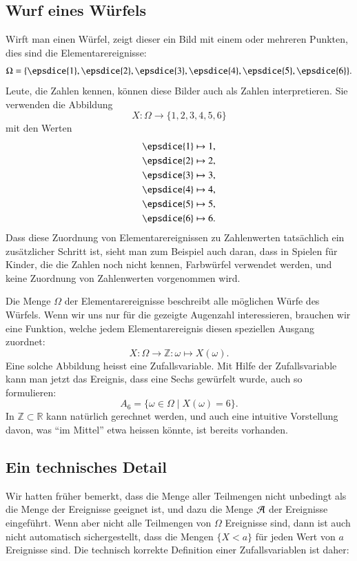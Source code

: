 \subsection{Wurf eines Würfels}
Wirft man einen Würfel, zeigt dieser ein Bild mit einem oder mehreren Punkten, 
dies sind die Elementarereignisse:
\[
\Omega = \{
\epsdice{1},
\epsdice{2},
\epsdice{3},
\epsdice{4},
\epsdice{5},
\epsdice{6}
\}.
\]
Leute, die Zahlen kennen, können diese Bilder auch als Zahlen interpretieren.
Sie verwenden die Abbildung
\[
X\colon \Omega \to \{1,2,3,4,5,6\}
\]
mit den Werten
\begin{align*}
\epsdice{1}&\mapsto 1,\\
\epsdice{2}&\mapsto 2,\\
\epsdice{3}&\mapsto 3,\\
\epsdice{4}&\mapsto 4,\\
\epsdice{5}&\mapsto 5,\\
\epsdice{6}&\mapsto 6.
\end{align*}
Dass diese Zuordnung von Elementarereignissen zu Zahlenwerten tatsächlich
ein zusätzlicher Schritt ist, sieht man zum Beispiel auch daran, dass
in Spielen für Kinder, die die Zahlen noch nicht kennen, Farbwürfel
verwendet werden, und keine Zuordnung von Zahlenwerten vorgenommen wird.

Die Menge $\Omega$ der Elementarereignisse beschreibt alle möglichen Würfe
des Würfels.
Wenn wir uns nur für die gezeigte Augenzahl interessieren,
brauchen wir eine Funktion, welche jedem Elementarereignis diesen speziellen
Ausgang zuordnet:
\[
X: \Omega\to{\mathbb Z}: \omega\mapsto X(\omega).
\]
Eine solche Abbildung heisst eine Zufallsvariable.
Mit Hilfe der Zufallsvariable kann man jetzt das Ereignis, dass eine Sechs
gewürfelt wurde, auch so formulieren:
\[
A_6=\{\omega\in\Omega\;|\;X(\omega) = 6\}.
\]
In $\mathbb{Z}\subset\mathbb{R}$ kann natürlich gerechnet werden, und
auch eine intuitive Vorstellung davon, was ``im Mittel'' etwa heissen
könnte, ist bereits vorhanden.

\subsection{Ein technisches Detail}
Wir hatten früher bemerkt, dass die Menge aller Teilmengen nicht unbedingt
als die Menge der Ereignisse geeignet ist, und dazu die Menge
$\cal A$ der Ereignisse eingeführt.
Wenn aber nicht alle Teilmengen von $\Omega$ Ereignisse sind,
dann ist auch nicht automatisch sichergestellt, dass die
Mengen $\{X < a\}$ für jeden Wert von $a$  Ereignisse sind.
Die technisch korrekte Definition einer Zufallsvariablen ist daher:

